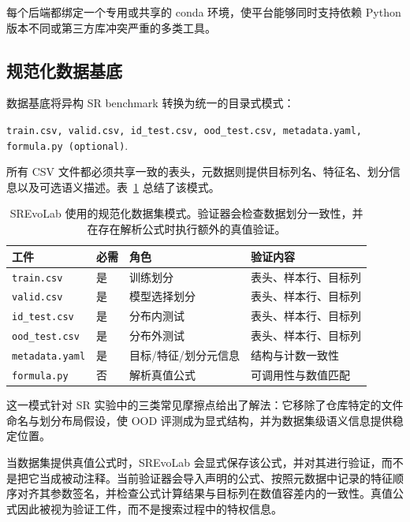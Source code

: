 \documentclass[UTF8]{ctexart}
\begin{document}
每个后端都绑定一个专用或共享的 conda 环境，使平台能够同时支持依赖 Python 版本不同或第三方库冲突严重的多类工具。

\subsection{规范化数据基底}

数据基底将异构 SR benchmark 转换为统一的目录式模式：
\begin{center}
\texttt{train.csv, valid.csv, id\_test.csv, ood\_test.csv, metadata.yaml, formula.py (optional)}.
\end{center}
所有 CSV 文件都必须共享一致的表头，元数据则提供目标列名、特征名、划分信息以及可选语义描述。表~\ref{tab:dataset-schema} 总结了该模式。

\begin{table}[t]
\centering
\scriptsize
\begin{tabular}{>{\raggedright\arraybackslash}p{2.4cm}>{\raggedright\arraybackslash}p{1.4cm}>{\raggedright\arraybackslash}p{3.0cm}>{\raggedright\arraybackslash}p{4.1cm}}
\toprule
工件 & 必需 & 角色 & 验证内容 \\
\midrule
\texttt{train.csv} & 是 & 训练划分 & 表头、样本行、目标列 \\
\texttt{valid.csv} & 是 & 模型选择划分 & 表头、样本行、目标列 \\
\texttt{id\_test.csv} & 是 & 分布内测试 & 表头、样本行、目标列 \\
\texttt{ood\_test.csv} & 是 & 分布外测试 & 表头、样本行、目标列 \\
\texttt{metadata.yaml} & 是 & 目标/特征/划分元信息 & 结构与计数一致性 \\
\texttt{formula.py} & 否 & 解析真值公式 & 可调用性与数值匹配 \\
\bottomrule
\end{tabular}
\caption{SREvoLab 使用的规范化数据集模式。验证器会检查数据划分一致性，并在存在解析公式时执行额外的真值验证。}
\label{tab:dataset-schema}
\end{table}

这一模式针对 SR 实验中的三类常见摩擦点给出了解法：它移除了仓库特定的文件命名与划分布局假设，使 OOD 评测成为显式结构，并为数据集级语义信息提供稳定位置。

当数据集提供真值公式时，SREvoLab 会显式保存该公式，并对其进行验证，而不是把它当成被动注释。当前验证器会导入声明的公式、按照元数据中记录的特征顺序对齐其参数签名，并检查公式计算结果与目标列在数值容差内的一致性。真值公式因此被视为验证工件，而不是搜索过程中的特权信息。
\end{document}
